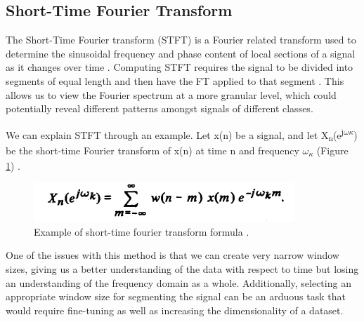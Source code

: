 \documentclass{turabian-thesis}[12pt]
\begin{document}
\subsection{Short-Time Fourier Transform}
The Short-Time Fourier transform (STFT) is a Fourier related transform used to determine the sinusoidal frequency and phase content of local sections of a signal as it changes over time \cite{hill_uncertainty_nodate}.
Computing STFT requires the signal to be divided into segments of equal length and then have the FT applied to that segment \cite{allen_unified_1977}. This allows us to view the Fourier spectrum at a more granular level, which could potentially reveal different patterns amongst signals of different classes. 

We can explain STFT through an example. Let x(n) be a signal, and let X\textsubscript{n}(e\textsuperscript{j$\omega\kappa$}) be the short-time Fourier transform of x(n) at time n and frequency $\omega$\textsubscript{$\kappa$} (Figure \ref{fig:stft_example}) \cite{allen_unified_1977}. 

\begin{figure}[h]
   \begin{center}
      \includegraphics[scale=0.6]{../media/stft_eq.png}
   \end{center}
   \caption{Example of short-time fourier transform formula \cite{allen_unified_1977}.}
   \label{fig:stft_example}
\end{figure}

One of the issues with this method is that we can create very narrow window sizes, giving us a better understanding of the data with respect to time but losing an understanding of the frequency domain as a whole. Additionally, selecting an appropriate window size for segmenting the signal can be an arduous task that would require fine-tuning as well as increasing the dimensionality of a dataset.
\end{document}
